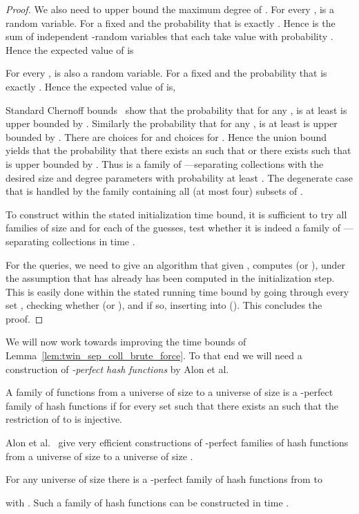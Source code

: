 \begin{proof}
We also need to upper bound the maximum degree of . For every ,  is a random variable. For a fixed  and  the probability 
that  is exactly . Hence  is the sum of  independent  -random variables that each take value  with probability . Hence the expected value of  is 
 
For every ,  is also a random variable. For a fixed  and  the probability that  is exactly . 
Hence the expected value of  is,

Standard Chernoff bounds~\cite[Theorem 4.4]{mitzenmacher2005probability} show that the probability that for any ,  
is at least  is upper bounded by . 
Similarly the probability that for any ,  is at least  is upper bounded by .  
There are   choices for  and  choices for . 
Hence the union bound yields that the probability that there exists an  such that  or there exists  such 
that  is upper bounded by . Thus  is a family of ---separating collections with the desired size and degree parameters with probability at least 
. The degenerate case that   is handled 
by the family  containing all (at most four) subsets of . 

To construct  within the stated initialization time bound, it is sufficient to try all families  of size  and for each of the  
guesses, test whether it is indeed a family of ---separating collections in time .

For the queries, we need to give an algorithm that given , computes  (or ), under the assumption that  has already has been computed in the initialization step. 
This is easily done within the stated running time bound by going through every set , checking whether  (or ), and if so, inserting  into  (). 
This concludes the proof.
\end{proof}
We will now work towards improving the time bounds of Lemma~\ref{lem:twin_sep_coll_brute_force}. 
 To that end we will need a construction of {\em -perfect hash functions} by Alon et al.~\cite{AlonYZ}
\begin{definition} 
A family of functions  from a universe  of size  to a universe of size  is a -perfect family of hash functions if for every set  such that  
there exists an  such that the restriction of  to  is injective.
\end{definition}
Alon et al.~\cite{AlonYZ} give very efficient constructions of -perfect families of hash functions from a universe of size  to a universe of size .
\begin{proposition}\label{prop:hashFun} 
For any universe  of size  there is a -perfect family  of hash functions from  to 
 
with . 
Such a family of hash functions can be constructed in time . 
\end{proposition}

